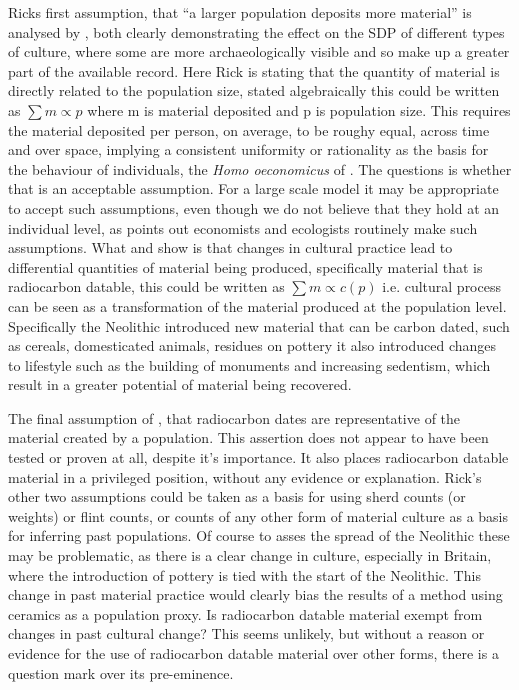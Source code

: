 Ricks first assumption, that ``a larger population deposits more material'' \citep[56]{10.2307/281060} is analysed by \citet{Torfing2015193,CROMBE2014558}, both clearly demonstrating the effect on the SDP of different types of culture, where some are more archaeologically visible and so make up a greater part of the available record. Here Rick is stating that the quantity of material is directly related to the population size, stated algebraically this could be written as $\sum m \propto p$ where m is material deposited and p is population size. This requires the material deposited per person, on average, to be roughy equal, across time and over space, implying a consistent uniformity or rationality as the basis for the behaviour of individuals, the \textit{Homo oeconomicus} of \citet[197]{Shennan:1991uq}. The questions is whether that is an acceptable assumption. For a large scale model it may be appropriate to accept such assumptions, even though we do not believe that they hold at an individual level, as \citet{Shennan:1991uq} points out economists and ecologists routinely make such assumptions. What \citet{Torfing2015193} and \citet{CROMBE2014558} show is that changes in cultural practice lead to differential quantities of material being produced, specifically material that is radiocarbon datable, this could be written as $\sum m \propto c(p)$ i.e. cultural process can be seen as a transformation of the material produced at the population level. Specifically the Neolithic introduced new material that can be carbon dated, such as cereals, domesticated animals, residues on pottery it also introduced changes to lifestyle such as the building of monuments and increasing sedentism, which result in a greater potential of material being recovered. 

The final assumption of \cite{10.2307/281060}, that radiocarbon dates are representative of the material created by a population. This assertion does not appear to have been tested or proven at all, despite it's importance. It also places radiocarbon datable material in a privileged position, without any evidence or explanation. Rick's other two assumptions could be taken as a basis for using sherd counts (or weights) or flint counts, or counts of any other form of material culture as a basis for inferring past populations. Of course to asses the spread of the Neolithic these may be problematic, as there is a clear change in culture, especially in Britain, where the introduction of pottery is tied with the start of the Neolithic. This change in past material practice would clearly bias the results of a method using ceramics as a population proxy. Is radiocarbon datable material exempt from changes in past cultural change? This seems unlikely, but without a reason or evidence for the use of radiocarbon datable material over other forms, there is a question mark over its pre-eminence.


